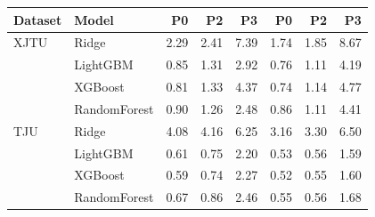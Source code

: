 \begin{tabular}{llrrrrrr}
\toprule
Dataset & Model & P0 & P2 & P3 & P0  & P2  & P3  \\
\midrule
XJTU & Ridge & 2.29 & 2.41 & 7.39 & 1.74 & 1.85 & 8.67 \\
 & LightGBM & 0.85 & 1.31 & 2.92 & 0.76 & 1.11 & 4.19 \\
 & XGBoost & 0.81 & 1.33 & 4.37 & 0.74 & 1.14 & 4.77 \\
 & RandomForest & 0.90 & 1.26 & 2.48 & 0.86 & 1.11 & 4.41 \\
TJU & Ridge & 4.08 & 4.16 & 6.25 & 3.16 & 3.30 & 6.50 \\
 & LightGBM & 0.61 & 0.75 & 2.20 & 0.53 & 0.56 & 1.59 \\
 & XGBoost & 0.59 & 0.74 & 2.27 & 0.52 & 0.55 & 1.60 \\
 & RandomForest & 0.67 & 0.86 & 2.46 & 0.55 & 0.56 & 1.68 \\
\bottomrule
\end{tabular}
